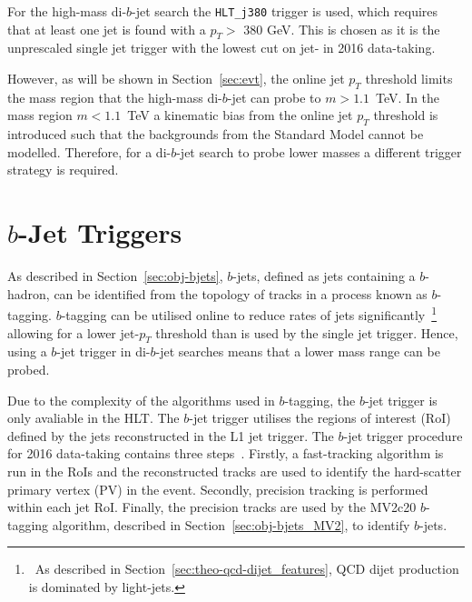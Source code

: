 
For the high-mass di-$b$-jet search the \verb|HLT_j380| trigger is used, which requires that at least one jet is found with a $p_T >$ 380 GeV.
This is chosen as it is the unprescaled single jet trigger with the lowest cut on jet-\pT{} in 2016 data-taking.

However, as will be shown in Section~\ref{sec:evt},
the online jet $p_T$ threshold limits the mass region that the high-mass di-$b$-jet can probe to $m > 1.1$~TeV.
In the mass region $m < 1.1$~TeV a kinematic bias from the online jet $p_T$ threshold is introduced
such that the backgrounds from the Standard Model cannot be modelled. 
Therefore, for a di-$b$-jet search to probe lower masses a different trigger strategy is required.

\vfill

\section{$b$-Jet Triggers}
\label{sec:trig-bjet}

As described in Section~\ref{sec:obj-bjets}, $b$-jets, defined as jets containing a $b$-hadron,
can be identified from the topology of tracks in a process known as $b$-tagging.
$b$-tagging can be utilised online to reduce rates of jets significantly~\footnote{\ As described in Section~\ref{sec:theo-qcd-dijet_features},
  QCD dijet production is dominated by light-jets.}
allowing for a lower jet-$p_T$ threshold than is used by the single jet trigger.
Hence, using a $b$-jet trigger in di-$b$-jet searches means that a lower mass range can be probed.

Due to the complexity of the algorithms used in $b$-tagging,
the $b$-jet trigger is only avaliable in the HLT.
The $b$-jet trigger utilises the regions of interest (RoI) defined by the jets reconstructed in the L1 jet trigger.
The $b$-jet trigger procedure for 2016 data-taking contains three steps~\cite{trig-bTrig_desc}.
Firstly, a fast-tracking algorithm is run in the RoIs and
the reconstructed tracks are used to identify the hard-scatter primary vertex (PV) in the event.
Secondly, precision tracking is performed within each jet RoI.
Finally, the precision tracks are used by the MV2c20 $b$-tagging algorithm, described in Section~\ref{sec:obj-bjets_MV2}, to identify $b$-jets.

